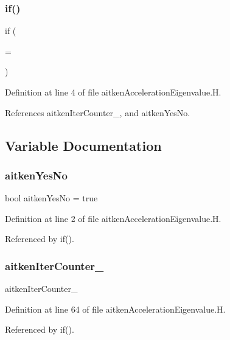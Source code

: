 \subsubsection{\texorpdfstring{if()}{if()}}
{\footnotesize\ttfamily if (\begin{DoxyParamCaption}\item[{\hyperlink{aitkenAccelerationEigenvalue_8H_a42fc7d50fc0083c20cb76d5bd59b4b58}{aitken\+Iter\+Counter\+\_\+}}]{ = {} }\end{DoxyParamCaption})}



Definition at line 4 of file aitken\+Acceleration\+Eigenvalue.\+H.



References aitken\+Iter\+Counter\+\_\+, and aitken\+Yes\+No.



\subsection{Variable Documentation}
\mbox{\label{aitkenAccelerationEigenvalue_8H_a54b3011be8f08fc82447c253fd5ddfef}} 
\subsubsection{\texorpdfstring{aitken\+Yes\+No}{aitkenYesNo}}
{\footnotesize\ttfamily bool aitken\+Yes\+No = true}



Definition at line 2 of file aitken\+Acceleration\+Eigenvalue.\+H.



Referenced by if().

\mbox{\label{aitkenAccelerationEigenvalue_8H_a42fc7d50fc0083c20cb76d5bd59b4b58}} 
\subsubsection{\texorpdfstring{aitken\+Iter\+Counter\+\_\+}{aitkenIterCounter\_}}
{\footnotesize\ttfamily aitken\+Iter\+Counter\+\_\+}



Definition at line 64 of file aitken\+Acceleration\+Eigenvalue.\+H.



Referenced by if().

